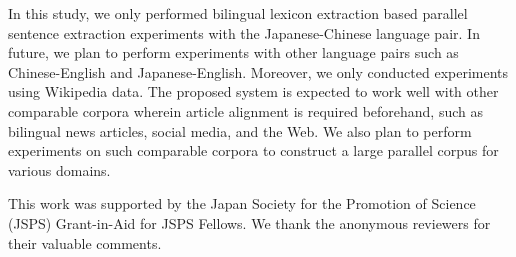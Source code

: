 \documentclass[english]{jnlp_1.4}
\begin{document}
In this study, we only performed bilingual lexicon extraction based parallel sentence extraction 
experiments with the Japanese-Chinese language pair. In future, we plan to perform experiments with 
other language pairs such as Chinese-English and Japanese-English. Moreover, we only conducted experiments 
using Wikipedia data. The proposed system is expected to work well with other comparable corpora 
wherein article alignment is required beforehand, such as bilingual news articles, social media, 
and the Web. We also plan to perform experiments on such comparable corpora to construct a large 
parallel corpus for various domains.


\acknowledgment

This work was supported by the Japan Society for the Promotion of Science (JSPS) 
Grant-in-Aid for JSPS Fellows. We thank the anonymous reviewers for their 
valuable comments.
\end{document}
